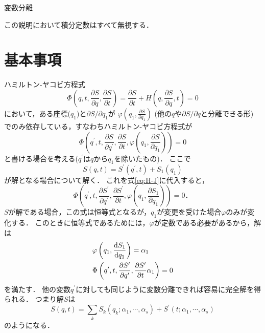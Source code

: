 \documentclass[a4paper,12pt]{jsarticle}
\newcommand{\dif}[2]{\frac{{\rm d} #1}{{\rm d} #2}}
\newcommand{\pdif}[2]{\frac{\partial #1}{\partial #2}}
\begin{document}
	\begin{center}
		\Large{変数分離}
	\end{center}
	
	この説明において積分定数はすべて無視する．
	
	\section{基本事項}
	ハミルトン-ヤコビ方程式
	\begin{equation}
	\Phi \left( q, t, \pdif{S}{q}, \pdif{S}{t} \right)
	= \pdif{S}{t} + H \left( q, \pdif{S}{q}, t \right)
	= 0
	\end{equation}
	において，ある座標($q_1$)と$\partial S / \partial q_1$が
	$\varphi \left( q_1, \pdif{S}{q_1} \right)$
	(他の$q$や$\partial S / \partial q$と分離できる形)
	でのみ依存している，すなわちハミルトン-ヤコビ方程式が
	\begin{equation}
	\Phi \left( q^{\prime}, t, \pdif{S}{q^{\prime}}, \pdif{S}{t}, 
	\varphi \left( q_1, \pdif{S}{q_1} \right) \right) = 0 
	\label{eq:H-J}
	\end{equation}
	と書ける場合を考える($q^{\prime}$は$q$から$q_1$を除いたもの)．
	ここで
	\begin{equation}
	S(q, t) = S^{\prime}(q^{\prime}, t) + S_1(q_1)
	\end{equation}
	が解となる場合について解く．
	これを式\eqref{eq:H-J}に代入すると，
	\begin{equation}
	\Phi \left( q^{\prime}, t, \pdif{S^{\prime}}{q^{\prime}}, \pdif{S^{\prime}}{t}, 
	\varphi \left( q_1, \pdif{S_1}{q_1} \right) \right) = 0 \mbox{．}
	\end{equation}
	$S$が解である場合，この式は恒等式となるが，$q_1$が変更を受けた場合$\varphi$のみが変化する．
	このときに恒等式であるためには，$\varphi$が定数である必要があるから，解は
	\begin{align}
	\begin{aligned}
	&\varphi \left( q_1, \dif{S_1}{q_1} \right) = \alpha_1 \\
	&\Phi \left( q^{\prime}, t, \pdif{S^{\prime}}{q^{\prime}},
	\pdif{S^{\prime}}{t} \alpha_1 \right) = 0
	\label{eq:sol}
	\end{aligned}
	\end{align}
	を満たす．
	他の変数$q^{\prime}$に対しても同じように変数分離できれば容易に完全解を得られる．
	つまり解$S$は
	\begin{equation}
	S(q, t) = \sum_k S_k \left( q_k; \alpha_1, \cdots, \alpha_s \right)
	+ S^{\prime} \left( t; \alpha_1, \cdots, \alpha_s \right)
	\end{equation}
	のようになる．
	
\end{document}
